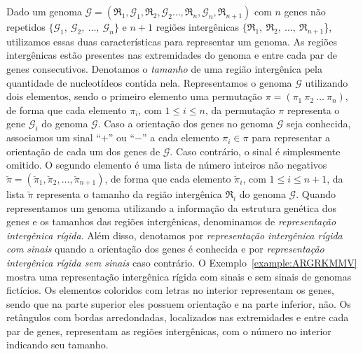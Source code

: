 Dado um genoma $\mathcal{G}=(\mathfrak{R}_1,\mathcal{G}_1,\mathfrak{R}_2,\mathcal{G}_2\dots,\mathfrak{R}_n,\mathcal{G}_n,\mathfrak{R}_{n+1})$ com $n$ genes não repetidos $\{\mathcal{G}_1,\:\mathcal{G}_2,\:\dots,\:\mathcal{G}_n\}$ e $n+1$ regiões intergênicas $\{\mathfrak{R}_1,\:\mathfrak{R}_2,\:\dots,\:\mathfrak{R}_{n+1}$\}, utilizamos essas duas características para representar um genoma. As regiões intergênicas estão presentes nas extremidades do genoma e entre cada par de genes consecutivos. Denotamos o \emph{tamanho} de uma região intergênica pela quantidade de nucleotídeos contida nela. Representamos o genoma $\mathcal{G}$ utilizando dois elementos, sendo o primeiro elemento uma permutação $\pi=(\pi_1~\pi_2~\dots~\pi_n)$, de forma que cada elemento $\pi_i$, com $1 \le i \le n$, da permutação $\pi$ representa o gene $\mathcal{G}_i$ do genoma $\mathcal{G}$. Caso a orientação dos genes no genoma $\mathcal{G}$ seja conhecida, associamos um sinal ``$+$'' ou ``$-$'' a cada elemento $\pi_i \in \pi$ para representar a orientação de cada um dos genes de $\mathcal{G}$. Caso contrário, o sinal é simplesmente omitido. O segundo elemento é uma lista de número inteiros não negativos $\breve\pi=(\breve\pi_1,\breve\pi_2,\dots,\breve\pi_{n+1})$, de forma que cada elemento $\breve\pi_i$, com $1 \le i \le {n+1}$, da lista $\breve\pi$ representa o tamanho da região intergênica $\mathfrak{R}_i$ do genoma $\mathcal{G}$. Quando representamos um genoma utilizando a informação da estrutura genética dos genes e os tamanhos das regiões intergênicas, denominamos de \emph{representação intergênica rígida}. Além disso, denotamos por \emph{representação intergênica rígida com sinais} quando a orientação dos genes é conhecida e por \emph{representação intergênica rígida sem sinais} caso contrário. O Exemplo~\ref{example:ARGRKMMV} mostra uma representação intergênica rígida com sinais e sem sinais de genomas fictícios. Os elementos coloridos com letras no interior representam os genes, sendo que na parte superior eles possuem orientação e na parte inferior, não. Os retângulos com bordas arredondadas, localizados nas extremidades e entre cada par de genes, representam as regiões intergênicas, com o número no interior indicando seu tamanho. 



